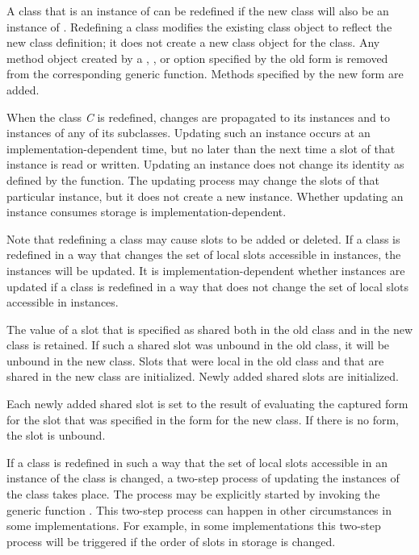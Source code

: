 A class that is an instance of  can be redefined
if the new class will also be an instance of .
Redefining a class modifies the existing class object to reflect the
new class definition; it does not create a new class object for the
class.  Any method object created by a , , or
 option specified by the old  form is
removed from the corresponding generic function.
Methods specified by the new  form are added.


When the class \emph{C} is redefined, changes are propagated to its instances
and to instances of any of its subclasses.  Updating such an
instance occurs at an implementation-dependent time, but no later than
the next time a slot of that instance is read or written.  Updating an
instance does not change its identity as defined by the 
function.  The updating process may change the slots of that
particular instance, but it does not create a new instance.  Whether
updating an instance consumes storage is implementation-dependent.

Note that redefining a class may cause slots to be added or deleted.
If a class is redefined in a way that changes the set of local slots
accessible in instances, the instances will be updated.  It is
implementation-dependent whether instances are updated if a class is
redefined in a way that does not change the set of local slots
accessible in instances.

The value of a slot that is specified as shared both in the old class
and in the new class is retained.  If such a shared slot was unbound
in the old class, it will be unbound in the new class.  Slots that
were local in the old class and that are shared in the new class are
initialized.  Newly added shared slots are initialized.

Each newly added shared slot is set to the result of evaluating the
captured  form for the slot that was specified in the
 form for the new class. If there is no 
form, the slot is unbound.

If a class is redefined in such a way that the set of local slots
accessible in an instance of the class is changed, a two-step process
of updating the instances of the class takes place.  The process may
be explicitly started by invoking the generic function 
.  This two-step process can happen in other
circumstances in some implementations.  For example, in some
implementations this two-step process will be triggered if the order
of slots in storage is changed.

